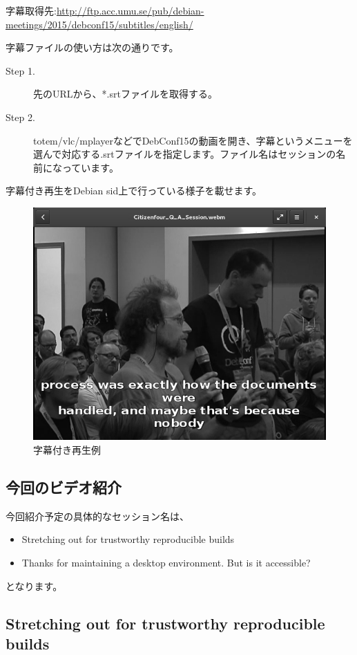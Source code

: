 \documentclass[mingoth,a4paper]{jsarticle}
\begin{document}
 字幕取得先:\url{http://ftp.acc.umu.se/pub/debian-meetings/2015/debconf15/subtitles/english/}

 字幕ファイルの使い方は次の通りです。
 
  \begin{description}
\item [Step 1.] 先のURLから、*.srtファイルを取得する。
\item [Step 2.] totem/vlc/mplayerなどでDebConf15の動画を開き、字幕というメニューを選んで対応する.srtファイルを指定します。ファイル名はセッションの名前になっています。
  \end{description}    
  
 字幕付き再生をDebian sid上で行っている様子を載せます。
  
\begin{figure}[H]
\begin{center}
\includegraphics[width=0.5\hsize]{image201510/subtitle_mono.png}
\end{center}
\caption{字幕付き再生例}
\end{figure}

\subsection{今回のビデオ紹介}

 今回紹介予定の具体的なセッション名は、

\begin{itemize}
\item Stretching out for trustworthy reproducible builds
\item Thanks for maintaining a desktop environment. But is it accessible?
\end{itemize}

となります。

\subsection{Stretching out for trustworthy reproducible builds}
\end{document}
